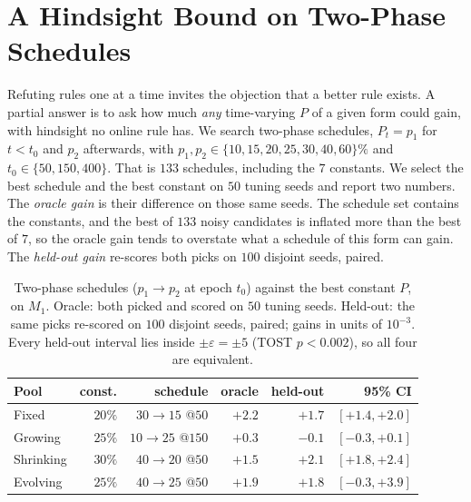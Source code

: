 \documentclass[sigconf,anonymous,review,nonacm]{acmart}
\begin{document}
\section{A Hindsight Bound on Two-Phase Schedules}
\label{sec:headroom}

Refuting rules one at a time invites the objection that a better rule exists. A partial
answer is to ask how much \emph{any} time-varying $P$ of a given form could gain, with
hindsight no online rule has. We search two-phase schedules, $P_t=p_1$ for $t<t_0$ and
$p_2$ afterwards, with $p_1,p_2\in\{10,15,20,25,30,40,60\}\%$ and $t_0\in\{50,150,400\}$.
That is $133$ schedules, including the $7$ constants. We select the best schedule and the
best constant on $50$ tuning seeds and report two numbers. The \emph{oracle gain} is their
difference on those same seeds. The schedule set contains the constants, and the best of
$133$ noisy candidates is inflated more than the best of $7$, so the oracle gain tends to
overstate what a schedule of this form can gain. The \emph{held-out gain} re-scores both
picks on $100$ disjoint seeds, paired.

\begin{table}[t]\centering\small
\caption{Two-phase schedules ($p_1{\to}p_2$ at epoch $t_0$) against the best constant $P$,
on $M_1$. Oracle: both picked and scored on $50$ tuning seeds. Held-out: the same picks
re-scored on $100$ disjoint seeds, paired; gains in units of $10^{-3}$. Every
held-out interval lies inside $\pm\varepsilon=\pm5$ (TOST $p<0.002$), so all four are
equivalent.}
\label{tab:headroom}
\setlength{\tabcolsep}{2.5pt}
\begin{tabular}{lrrrrr}
\toprule
Pool & const. & schedule & oracle & held-out & 95\% CI\\
\midrule
Fixed     & $20\%$ & $30{\to}15$ @$50$  & $+2.2$ & $+1.7$ & $[+1.4,+2.0]$\\
Growing   & $25\%$ & $10{\to}25$ @$150$ & $+0.3$ & $-0.1$ & $[-0.3,+0.1]$\\
Shrinking & $30\%$ & $40{\to}20$ @$50$  & $+1.5$ & $+2.1$ & $[+1.8,+2.4]$\\
Evolving  & $25\%$ & $40{\to}25$ @$50$  & $+1.9$ & $+1.8$ & $[-0.3,+3.9]$\\
\bottomrule
\end{tabular}
\end{table}
\end{document}
